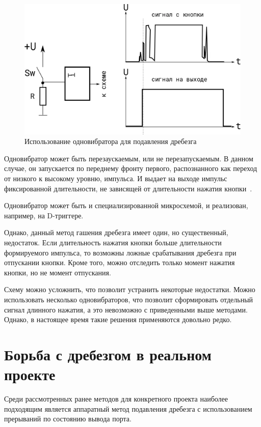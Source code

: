\documentclass{altsu-report}
\begin{document}
\begin{figure}[H]
    \centering
    \includegraphics{vibrator.png}
    \caption{Использование одновибратора для подавления дребезга}
    \label{fig:vib}
\end{figure}

Одновибратор может быть перезаускаемым, или не перезапускаемым. В данном случае, он запускается по переднему фронту первого, распознанного как переход от низкого к высокому уровню, импульса. И выдает на выходе импульс фиксированной длительности, не зависящей от длительности нажатия кнопки~\cite{dzen}.

Одновибратор может быть и специализированной микросхемой, и реализован, например, на D-триггере.

Однако, данный метод гашения дребезга имеет один, но существенный, недостаток. Если длительность нажатия кнопки больше длительности формируемого импульса, то возможны ложные срабатывания дребезга при отпускании кнопки. Кроме того, можно отследить только момент нажатия кнопки, но не момент отпускания.

Схему можно усложнить, что позволит устранить некоторые недостатки. Можно использовать несколько одновибраторов, что позволит сформировать отдельный сигнал длинного нажатия, а это невозможно с приведенными выше методами. Однако, в настоящее время такие решения применяются довольно редко.

\chapter{Борьба с дребезгом в реальном проекте}

Среди рассмотренных ранее методов для конкретного проекта наиболее подходящим является аппаратный метод подавления дребезга с использованием прерываний по состоянию вывода порта.
\end{document}
